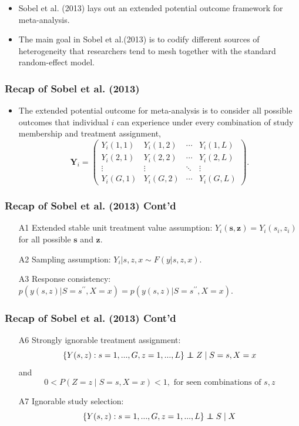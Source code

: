 \documentclass[xetex,mathserif,serif]{beamer}
\newcommand\independent{\protect\mathpalette{\protect\independenT}{\perp}}
\def\independenT#1#2{\mathrel{\rlap{$#1#2$}\mkern2mu{#1#2}}}
\begin{document}
\begin{frame}
  \begin{itemize}
  \item Sobel et al. (2013) lays out an extended potential outcome framework for
    meta-analysis.
  \item The main goal in Sobel et al.(2013) is to codify different sources of
    heterogeneity that researchers tend to mesh together with the standard
    random-effect model.
  \end{itemize}
\end{frame}

\begin{frame}
  \frametitle{Recap of Sobel et al. (2013)}
  \begin{itemize}
  \item The extended potential outcome for meta-analysis is to consider all
    possible outcomes that individual $i$ can experience under every combination
    of study membership and treatment assignment,
    \begin{equation*}
      \label{eq:fpo}
      \bm Y_i=
      \begin{pmatrix}
        Y_i(1,1) & Y_i(1,2) & \cdots & Y_i(1,L)\\
        Y_i(2,1) & Y_i(2,2) & \cdots & Y_i(2,L)\\
        \vdots & \vdots & \ddots & \vdots\\
        Y_i(G,1) & Y_i(G,2) & \cdots & Y_i(G,L)
      \end{pmatrix}.
    \end{equation*}
  \end{itemize}
\end{frame}

\begin{frame}
  \frametitle{Recap of Sobel et al. (2013) Cont'd}
  \begin{itemize}
  \item[A1] Extended stable unit treatment value assumption: $Y_i(\bm s,\bm
    z)=Y_i(s_i, z_i)$ for all possible $\bm s$ and $\bm z$.
  \item[A2] Sampling assumption: $Y_i|s,z,x\sim F(y|s,z,x)$.
  \item[A3] Response consistency:
    $p(y(s,z)|S=s^{\prime\prime},X=x)=p(y(s,z)|S=s^{\prime\prime},X=x)$.
  \end{itemize}
\end{frame}

\begin{frame}
  \frametitle{Recap of Sobel et al. (2013) Cont'd}
  \begin{itemize}
  \item[A6] Strongly ignorable treatment assignment:\\
     \[\{Y(s,z):s = 1,...,G, z = 1,...,L\} \independent Z\mid S = s, X =
     x\] and
     \[0<P(Z=z\mid S=s, X=x)<1, \text{ for seen combinations of } s,z\]
   \item[A7] Ignorable study selection: \\
     \[\{Y(s,z): s = 1,...,G, z = 1,...,L\} \independent S \mid X\]
  \end{itemize}
\end{frame}
\end{document}
